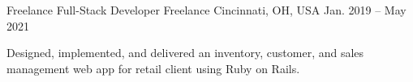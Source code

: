 \begin{cventries}
	\cventry
	{Freelance Full-Stack Developer} %
	{Freelance} %
	{Cincinnati, OH, USA} %
	{Jan. 2019 -- May 2021} %
	{
		\begin{cvitems}
			\item Designed, implemented, and delivered an inventory, customer, and
			sales management web app for retail client using Ruby on Rails.
		\end{cvitems}
	}

\end{cventries}
